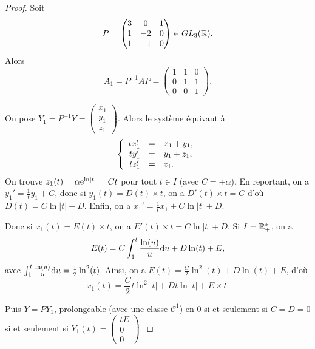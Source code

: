 \documentclass[12pt]{article}
\begin{document}
\begin{proof}
	Soit 
	\begin{equation*}
		P=\begin{pmatrix}
			3&0&1\\
			1&-2&0\\
			1&-1&0
		\end{pmatrix}\in GL_{3}(\mathbb{R}).
	\end{equation*}
	Alors 
	\begin{equation*}
		A_{1}=P^{-1}AP=\begin{pmatrix}
			1&1&0\\
			0&1&1\\
			0&0&1
		\end{pmatrix}.
	\end{equation*}

	On pose $Y_1=P^{-1}Y=\begin{pmatrix}
		x_1\\y_1\\z_1
	\end{pmatrix}$. Alors le système équivaut à 
	\begin{equation*}
		\left\lbrace
			\begin{array}[]{rcl}
				tx_1' &=& x_1+y_1,\\
				ty_1' &=& y_1+z_1,\\
				tz_1' &=& z_1.
			\end{array}
		\right.
	\end{equation*}
	On trouve $z_1(t)=\alpha\mathrm{e}^{\ln\left\lvert t\right\rvert}=C t$ pour tout $t\in I$ (avec $C=\pm\alpha$). En reportant, on a $y_1'=\frac{1}{t}y_1+C$, donc si $y_1(t)=D(t)\times t$, on a $D'(t)\times t=C$ d'où $D(t)=C\ln\left\lvert t\right\rvert+D$. Enfin, on a $x_1'=\frac{1}{t}x_1+C\ln\left\lvert t\right\rvert+D$.

	Donc si $x_1(t)=E(t)\times t$, on a $E'(t)\times t=C\ln\left\lvert t\right\rvert+D$. Si $I=\mathbb{R}_{+}^{*}$, on a 
	\begin{equation*}
		E(t)=C\int_{1}^{t}\frac{\ln(u)}{u}\mathrm{d} u+D\ln(t)+E,
	\end{equation*}
	avec $\int_{1}^{t}\frac{\ln(u)}{u}\mathrm{d} u=\frac{1}{2}\ln^{2}(t)$. Ainsi, on a $E(t)=\frac{C}{2}\ln^{2}(t)+D\ln(t)+E$, d'où 
	\begin{equation*}
		x_1(t)=\frac{C}{2}t\ln^{2}\left\lvert t\right\rvert+Dt\ln\left\lvert t\right\rvert+E\times t.
	\end{equation*}

	Puis $Y=PY_{1}$, prolongeable (avec une classe $\mathcal{C}^{1}$) en 0 si et seulement si $C=D=0$ si et seulement si $Y_1(t)=\begin{pmatrix}
		tE\\0\\0
	\end{pmatrix}$.
\end{proof}
\end{document}
